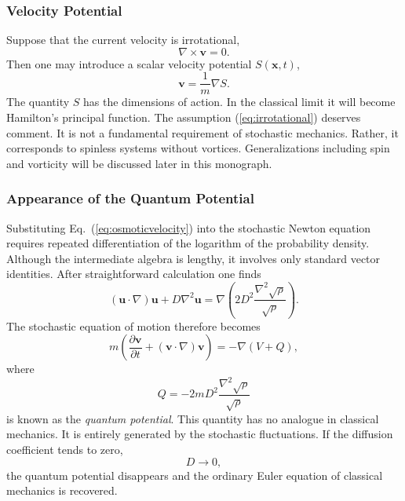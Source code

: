 \subsubsection*{Velocity Potential}
Suppose that the current velocity is irrotational,
\begin{equation}
\nabla\times\mathbf v=0.
\label{eq:irrotational}
\end{equation}
Then one may introduce a scalar velocity potential $S(\mathbf x,t)$,
\begin{equation}
\boxed{\mathbf v=\frac{1}{m}\nabla S.}
\label{eq:VelocityPotential}
\end{equation}
The quantity $S$ has the dimensions of action.
In the classical limit it will become Hamilton's principal function.
The assumption (\ref{eq:irrotational}) deserves comment.
It is not a fundamental requirement of stochastic mechanics.
Rather, it corresponds to spinless systems without vortices.
Generalizations including spin and vorticity will be discussed later in
this monograph.
\subsubsection*{Appearance of the Quantum Potential}
Substituting Eq.~(\ref{eq:osmoticvelocity}) into the stochastic Newton
equation requires repeated differentiation of the logarithm of the
probability density.
Although the intermediate algebra is lengthy, it involves only standard
vector identities.
After straightforward calculation one finds
\begin{equation}
(\mathbf u\cdot\nabla)\mathbf u+D\nabla^2\mathbf u=
\nabla\left(2D^2\frac{\nabla^2\sqrt{\rho}}{\sqrt{\rho}}\right).
\label{eq:Identity}
\end{equation}
The stochastic equation of motion therefore becomes
\begin{equation}
m\left(\frac{\partial\mathbf v}{\partial t}
+(\mathbf v\cdot\nabla)\mathbf v\right)
=-\nabla(V+Q),
\label{eq:EulerQuantum}
\end{equation}
where
\begin{equation}
\boxed{Q=-2mD^2\frac{\nabla^2\sqrt{\rho}}{\sqrt{\rho}}}
\label{eq:QuantumPotential}
\end{equation}
is known as the \emph{quantum potential}.
This quantity has no analogue in classical mechanics.
It is entirely generated by the stochastic fluctuations.
If the diffusion coefficient tends to zero,
\[D\rightarrow0,\]
the quantum potential disappears and the ordinary Euler equation of
classical mechanics is recovered.
